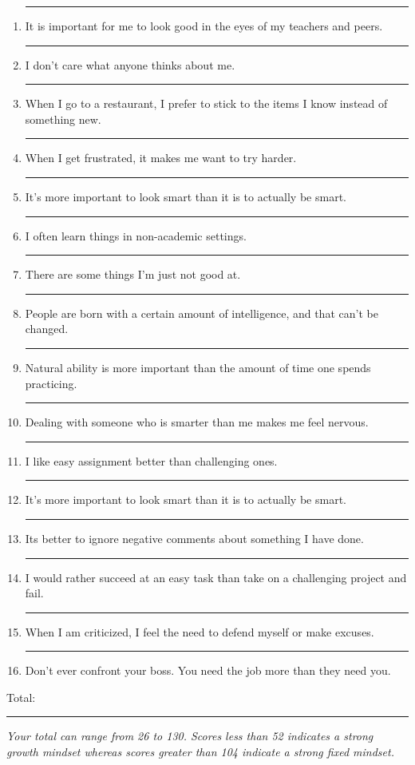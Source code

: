 \documentclass[letterpaper, 10pt]{article}
\begin{document}
\begin{enumerate}
	\item \rule{.5in}{.01in} It is important for me to look good in the eyes of my teachers and peers.
	
	\item \rule{.5in}{.01in} I don't care what anyone thinks about me.
	
	\item \rule{.5in}{.01in} When I go to a restaurant, I prefer to stick to the items I know instead of something new. 
	
	\item \rule{.5in}{.01in} When I get frustrated, it makes me want to try harder.
	
	\item \rule{.5in}{.01in} It's more important to look smart than it is to actually be smart.
	
	\item \rule{.5in}{.01in} I often learn things in non-academic settings.

	\item \rule{.5in}{.01in} There are some things I'm just not good at.
	\item \rule{.5in}{.01in} People are born with a certain amount of intelligence, and that can't be changed.
	\item \rule{.5in}{.01in} Natural ability is more important than the amount of time one spends practicing.
	\item \rule{.5in}{.01in} Dealing with someone who is smarter than me makes me feel nervous.
	\item \rule{.5in}{.01in} I like easy assignment better than challenging ones.
	\item \rule{.5in}{.01in} It's more important to look smart than it is to actually be smart.
	\item \rule{.5in}{.01in} Its better to ignore negative comments about something I have done.
	\item \rule{.5in}{.01in} I would rather succeed at an easy task than take on a challenging project and fail.
	\item \rule{.5in}{.01in} When I am criticized, I feel the need to defend myself or make excuses.
	\item \rule{.5in}{.01in} Don't ever confront your boss.  You need the job more than they need you.

	
\end{enumerate}
 
Total: \rule{.5in}{.01in}
\vspace{.5in}

\textit{Your total can range from 26 to 130.  Scores less than 52 indicates a strong growth mindset whereas scores greater than 104 indicate a strong fixed mindset. }
\end{document}
